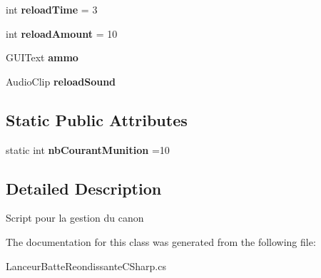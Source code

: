 \begin{DoxyCompactItemize}
\item 
\hypertarget{class_lanceur_batte_reondissante_c_sharp_a6b2e44a0ba652f99772257c0033ce2a9}{int {\bfseries reload\+Time} = 3}\label{class_lanceur_batte_reondissante_c_sharp_a6b2e44a0ba652f99772257c0033ce2a9}

\item 
\hypertarget{class_lanceur_batte_reondissante_c_sharp_a3d0786df93bb1fe07c1fcfca86103e43}{int {\bfseries reload\+Amount} = 10}\label{class_lanceur_batte_reondissante_c_sharp_a3d0786df93bb1fe07c1fcfca86103e43}

\item 
\hypertarget{class_lanceur_batte_reondissante_c_sharp_aeeb850e02446820d30d3f810ff79403f}{G\+U\+I\+Text {\bfseries ammo}}\label{class_lanceur_batte_reondissante_c_sharp_aeeb850e02446820d30d3f810ff79403f}

\item 
\hypertarget{class_lanceur_batte_reondissante_c_sharp_a821e12fec38528150872cd8376e7fcad}{Audio\+Clip {\bfseries reload\+Sound}}\label{class_lanceur_batte_reondissante_c_sharp_a821e12fec38528150872cd8376e7fcad}

\end{DoxyCompactItemize}
\subsection*{Static Public Attributes}
\begin{DoxyCompactItemize}
\item 
\hypertarget{class_lanceur_batte_reondissante_c_sharp_a152a1010c32d927d3477b1c42a0f8257}{static int {\bfseries nb\+Courant\+Munition} =10}\label{class_lanceur_batte_reondissante_c_sharp_a152a1010c32d927d3477b1c42a0f8257}

\end{DoxyCompactItemize}


\subsection{Detailed Description}
Script pour la gestion du canon 



The documentation for this class was generated from the following file\+:\begin{DoxyCompactItemize}
\item 
Lanceur\+Batte\+Reondissante\+C\+Sharp.\+cs\end{DoxyCompactItemize}
